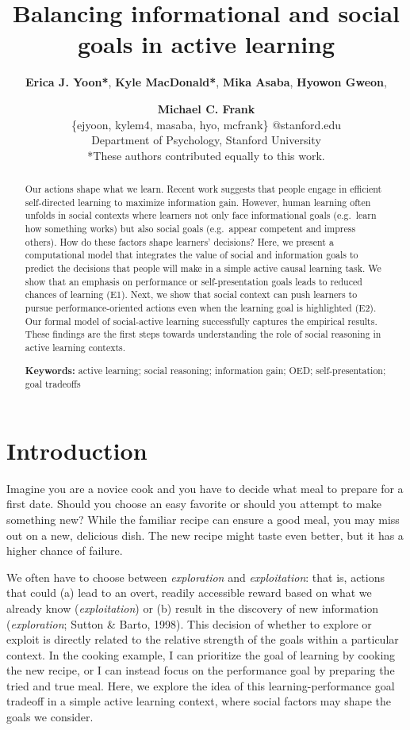 \documentclass[10pt, letterpaper]{article}
\title{Balancing informational and social goals in active learning}
\author{{\large \bf Erica J. Yoon*}, {\large \bf Kyle MacDonald*}, {\large \bf Mika Asaba}, {\large \bf Hyowon Gweon}, \and {\large \bf Michael C. Frank} \\ \{ejyoon, kylem4, masaba, hyo, mcfrank\} @stanford.edu \\ Department of Psychology, Stanford University \\ *These authors contributed equally to this work.}
\begin{document}
\maketitle

\begin{abstract}
Our actions shape what we learn. Recent work suggests that people engage
in efficient self-directed learning to maximize information gain.
However, human learning often unfolds in social contexts where learners
not only face informational goals (e.g.~learn how something works) but
also social goals (e.g.~appear competent and impress others). How do
these factors shape learners' decisions? Here, we present a
computational model that integrates the value of social and information
goals to predict the decisions that people will make in a simple active
causal learning task. We show that an emphasis on performance or
self-presentation goals leads to reduced chances of learning (E1). Next,
we show that social context can push learners to pursue
performance-oriented actions even when the learning goal is highlighted
(E2). Our formal model of social-active learning successfully captures
the empirical results. These findings are the first steps towards
understanding the role of social reasoning in active learning contexts.

\textbf{Keywords:}
active learning; social reasoning; information gain; OED;
self-presentation; goal tradeoffs
\end{abstract}

\section{Introduction}\label{introduction}

Imagine you are a novice cook and you have to decide what meal to
prepare for a first date. Should you choose an easy favorite or should
you attempt to make something new? While the familiar recipe can ensure
a good meal, you may miss out on a new, delicious dish. The new recipe
might taste even better, but it has a higher chance of failure.

We often have to choose between \emph{exploration} and
\emph{exploitation}: that is, actions that could (a) lead to an overt,
readily accessible reward based on what we already know
(\emph{exploitation}) or (b) result in the discovery of new information
(\emph{exploration}; Sutton \& Barto, 1998). This decision of whether to
explore or exploit is directly related to the relative strength of the
goals within a particular context. In the cooking example, I can
prioritize the goal of learning by cooking the new recipe, or I can
instead focus on the performance goal by preparing the tried and true
meal. Here, we explore the idea of this learning-performance goal
tradeoff in a simple active learning context, where social factors may
shape the goals we consider.
\end{document}
